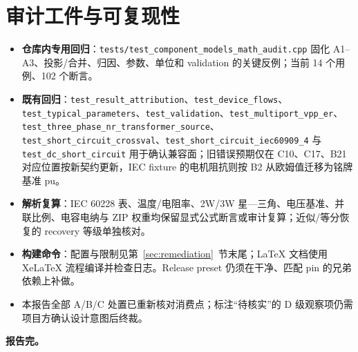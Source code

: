 \documentclass[11pt,a4paper,fontset=fandol]{ctexart}
\newcommand{\file}[1]{\texttt{#1}}
\begin{document}
\section{审计工件与可复现性}

\begin{itemize}
  \item \textbf{仓库内专用回归}：\file{tests/test\_component\_models\_math\_audit.cpp} 固化 A1--A3、投影/合并、归因、参数、单位和 validation 的关键反例；当前 14 个用例、102 个断言。
  \item \textbf{既有回归}：\file{test\_result\_attribution}、\file{test\_device\_flows}、\file{test\_typical\_parameters}、\file{test\_validation}、\file{test\_multiport\_vpp\_er}、\file{test\_three\_phase\_nr\_transformer\_source}、\file{test\_short\_circuit\_crossval}、\file{test\_short\_circuit\_iec60909\_4} 与 \file{test\_dc\_short\_circuit} 用于确认兼容面；旧错误预期仅在 C10、C17、B21 对应位置按新契约更新，IEC fixture 的电机阻抗则按 B2 从欧姆值迁移为铭牌基准 pu。
  \item \textbf{解析复算}：IEC 60228 表、温度/电阻率、2W/3W 星---三角、电压基准、并联比例、电容电纳与 ZIP 权重均保留显式公式断言或审计复算；近似/等分恢复的 recovery 等级单独核对。
  \item \textbf{构建命令}：配置与限制见第~\ref{sec:remediation}~节末尾；LaTeX 文档使用 XeLaTeX 流程编译并检查日志。Release preset 仍须在干净、匹配 pin 的兄弟依赖上补做。
  \item 本报告全部 A/B/C 处置已重新核对消费点；标注``待核实''的 D 级观察项仍需项目方确认设计意图后终裁。
\end{itemize}

\vspace{1.5em}
\noindent\textbf{报告完。}
\end{document}
